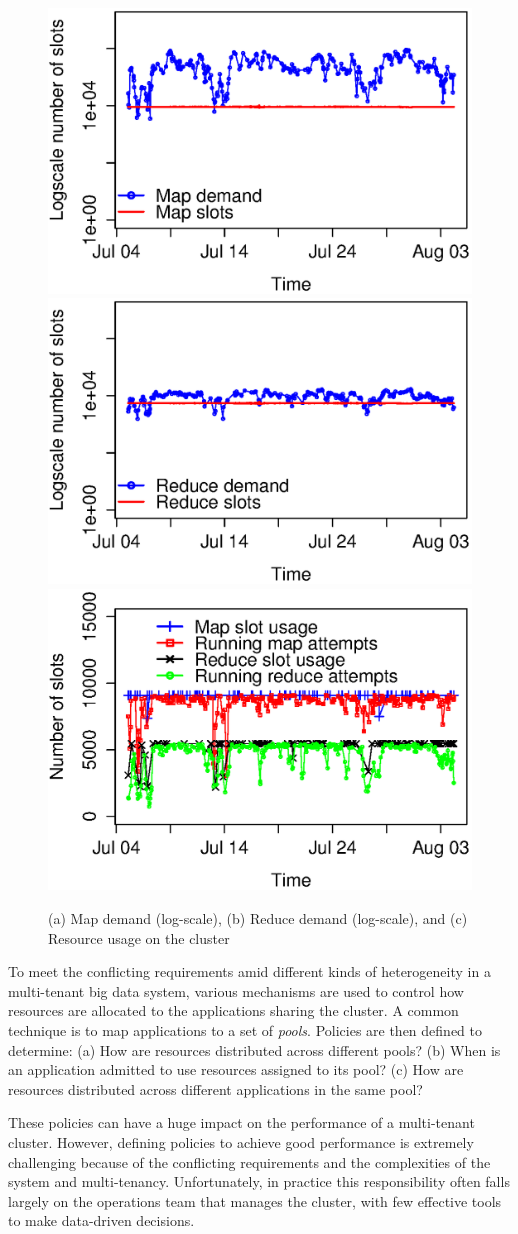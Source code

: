 \begin{figure}[t!]
        \centering
        \includegraphics[width=.3\textwidth]{map_demand_and_slots.eps}
        \includegraphics[width=.3\textwidth]{reduce_demand_and_slots.eps}
        \includegraphics[width=.3\textwidth]{demand_and_running.eps}
        \vspace{-4mm}
        \caption{(a) Map demand (log-scale), (b) Reduce demand (log-scale), and (c) 
 Resource usage on the cluster}
        \vspace{-6mm}
        \label{fig:demand}
\end{figure}

To meet the conflicting requirements amid different kinds of heterogeneity in a multi-tenant big data system, various mechanisms are used to control how resources are allocated to the applications sharing the cluster. A common technique is to map applications to a set of {\em pools}. Policies are then defined to determine: (a) How are resources distributed across different pools? (b) When is an application admitted to use resources assigned to its pool? (c) How are resources distributed across different applications in the same pool?

These policies can have a huge impact on the performance of a multi-tenant cluster. However, defining policies to achieve good performance is extremely challenging because of the conflicting requirements and the complexities of the system and multi-tenancy. Unfortunately, in practice this responsibility often falls largely on the operations team that manages the cluster, with few effective tools to make data-driven decisions. 

